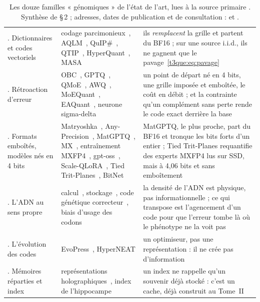 \begin{table}[p]
\begin{tabularx}{\linewidth}{>{\raggedright\arraybackslash}p{2.3cm} >{\raggedright\arraybackslash}X >{\raggedright\arraybackslash}X}
7. Dictionnaires et codes vectoriels & codage parcimonieux~\cite{olshausen1996}, AQLM~\cite{aqlm2024}, QuIP\#~\cite{quipsharp2024}, QTIP~\cite{genome-qtip}, HyperQuant~\cite{domb2026hyperquant}, MASA~\cite{zhussip2025masa} & ils \emph{remplacent} la grille et partent du BF16 ; sur une source i.i.d., ils ne gagnent que le pavage~\eqref{t3que:eq:pavage} \\
8. Rétroaction d'erreur & OBC~\cite{frantar2022obc}, GPTQ~\cite{frantar2022gptq}, QMoE~\cite{frantar2023qmoe}, AWQ~\cite{lin2023awq}, MoEQuant~\cite{hu2025moequant}, EAQuant~\cite{fu2025eaquant}, neurone sigma-delta~\cite{yoon2017sigmadelta} & un point de départ né en 4 bits, une grille imposée et emboîtée, le coût en débit ; et la contrainte qu'un complément sans perte rende le code exact derrière la base \\
9. Formats emboîtés, modèles nés en 4 bits & Matryoshka~\cite{nair2025matquant}, Any-Precision~\cite{park2024anyprecision}, MatGPTQ~\cite{kleinegger2026matgptq}, MX~\cite{rouhani2023microscaling}, entraînement MXFP4~\cite{tseng2025mxfp4}, gpt-oss~\cite{openai2025gptoss}, Scale-QLoRA~\cite{li2026scaleqlora}, Tied Trit-Planes~\cite{tiedtrit2026}, BitNet~\cite{bitnet2024} & MatGPTQ, le plus proche, part du BF16 et tronque les bits forts d'un entier ; Tied Trit-Planes requantifie des experts MXFP4 lus sur SSD, mais à 4,06 bits et sans emboîtement \\
10. L'ADN au sens propre & calcul~\cite{adleman1994}, stockage~\cite{church2012dna,goldman2013dna,erlich2017fountain}, code génétique correcteur~\cite{freeland1998}, biais d'usage des codons~\cite{sharp1987cai} & la densité de l'ADN est physique, pas informationnelle ; ce qui transpose est l'agencement d'un code pour que l'erreur tombe là où le phénotype ne la voit pas \\
11. L'évolution des codes & EvoPress~\cite{sieberling2024evopress}, HyperNEAT & un optimiseur, pas une représentation : il ne crée pas d'information \\
12. Mémoires réparties et index & représentations holographiques~\cite{plate1995hrr}, index de l'hippocampe~\cite{teyler1986} & un index ne rappelle qu'un souvenir déjà stocké : c'est un cache, déjà construit au Tome~II \\
\bottomrule
\end{tabularx}
\caption[Les douze familles de l'état de l'art]{Les douze familles « génomiques » de l'état de l'art, lues à la source primaire \litt. Synthèse de  §\,2 ; adresses, dates de publication et de consultation :  et .}
\label{t3que:tab:familles}
\end{table}

